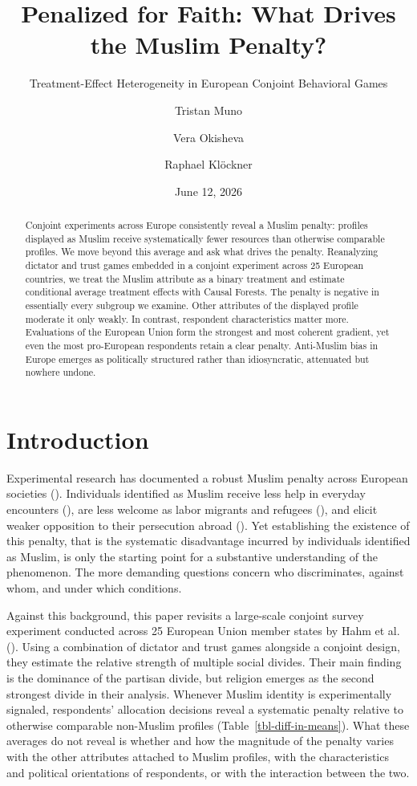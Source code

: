 \documentclass[
  10pt,
  a4paper,
  DIV=11,
  numbers=noendperiod]{scrartcl}
\title{Penalized for Faith: What Drives the Muslim Penalty?}
\subtitle{Treatment-Effect Heterogeneity in European Conjoint Behavioral
Games}
\author{Tristan Muno \and Vera Okisheva \and Raphael Klöckner}
\date{June 12, 2026}
\begin{document}
\maketitle
\begin{abstract}
Conjoint experiments across Europe consistently reveal a Muslim penalty:
profiles displayed as Muslim receive systematically fewer resources than
otherwise comparable profiles. We move beyond this average and ask what
drives the penalty. Reanalyzing dictator and trust games embedded in a
conjoint experiment across 25 European countries, we treat the Muslim
attribute as a binary treatment and estimate conditional average
treatment effects with Causal Forests. The penalty is negative in
essentially every subgroup we examine. Other attributes of the displayed
profile moderate it only weakly. In contrast, respondent characteristics
matter more. Evaluations of the European Union form the strongest and
most coherent gradient, yet even the most pro-European respondents
retain a clear penalty. Anti-Muslim bias in Europe emerges as
politically structured rather than idiosyncratic, attenuated but nowhere
undone.
\end{abstract}


\section{Introduction}\label{sec-introduction}

Experimental research has documented a robust Muslim penalty across
European societies (). Individuals identified as Muslim receive less help in everyday
encounters (), are less
welcome as labor migrants and refugees
(), and elicit
weaker opposition to their persecution abroad
(). Yet establishing
the existence of this penalty, that is the systematic disadvantage
incurred by individuals identified as Muslim, is only the starting point
for a substantive understanding of the phenomenon. The more demanding
questions concern who discriminates, against whom, and under which
conditions.

Against this background, this paper revisits a large-scale conjoint
survey experiment conducted across 25 European Union member states by
Hahm et al. (). Using a combination
of dictator and trust games alongside a conjoint design, they estimate
the relative strength of multiple social divides. Their main finding is
the dominance of the partisan divide, but religion emerges as the second
strongest divide in their analysis. Whenever Muslim identity is
experimentally signaled, respondents' allocation decisions reveal a
systematic penalty relative to otherwise comparable non-Muslim profiles
(Table~\ref{tbl-diff-in-means}). What these averages do not reveal is
whether and how the magnitude of the penalty varies with the other
attributes attached to Muslim profiles, with the characteristics and
political orientations of respondents, or with the interaction between
the two.
\end{document}
